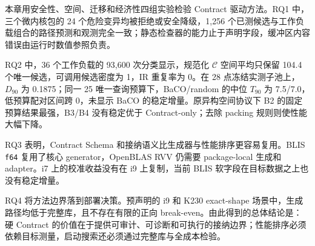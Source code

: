 本章用安全性、空间、迁移和经济性四组实验检验 Contract 驱动方法。RQ1 中，三个微内核包的 24 个危险变异均被拒绝或安全降级，1,256 个已测候选与工作负载组合的路径预测和观测完全一致；静态检查器的能力止于声明字段，缓冲区内容错误由运行时数值参照负责。

RQ2 中，36 个工作负载的 93,600 次分类显示，规范化 $\mathcal{C}$ 空间平均只保留 104.4 个唯一候选，可调用候选密度为 1，IR 重复率为 0。在 28 点冻结实测子池上，$D_{90}$ 为 0.1875；同一 25 唯一查询预算下，BaCO/random 的中位 $T_{90}$ 为 7.5/7.0，低预算配对区间跨 0，未显示 BaCO 的稳定增量。原异构空间协议下 B2 的固定预算结果最强，B3/B4 没有稳定优于 Contract-only；去除 packing 规则则使性能大幅下降。

RQ3 表明，Contract Schema 和接纳语义比生成器与性能排序更容易复用。BLIS \texttt{f64} 复用了核心 generator，OpenBLAS RVV 仍需要 package-local 生成和 adapter。i7 上的校准收益没有在 i9 上复制，当前 BLIS 软字段在目标数据之上也没有稳定增量。

RQ4 将方法边界落到部署决策。预声明的 i9 和 K230 exact-shape 场景中，生成路径均低于完整库，且不存在有限的正向 break-even。由此得到的总体结论是：硬 Contract 的价值在于提供可审计、可诊断和可执行的接纳边界；性能排序必须依赖目标测量，启动搜索还必须通过完整库与全成本检验。
